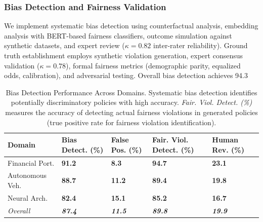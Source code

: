 \documentclass[manuscript,screen,review,anonymous,9pt]{acmart}
\newcommand{\tablesize}{\tiny}
\newcommand{\tablenumfmt}[1]{\textbf{#1}}
\newcommand{\tableheader}[1]{\textbf{#1}}
\begin{document}
\subsubsection{Bias Detection and Fairness Validation}
\label{subsubsec:bias_detection_evaluation}
We implement systematic bias detection using counterfactual analysis, embedding analysis with BERT-based fairness classifiers, outcome simulation against synthetic datasets, and expert review ($\kappa = 0.82$ inter-rater reliability). Ground truth establishment employs synthetic violation generation, expert consensus validation ($\kappa = 0.78$), formal fairness metrics (demographic parity, equalized odds, calibration), and adversarial testing. Overall bias detection achieves 94.3%

\begin{table}[htbp]
  \centering
  \caption{Bias Detection Performance Across Domains. Systematic bias detection identifies potentially discriminatory policies with high accuracy. \textit{Fair. Viol. Detect. (\%)} measures the accuracy of detecting actual fairness violations in generated policies (true positive rate for fairness violation identification).}
  \label{tab:bias_detection_performance}
  \tablesize
  \begin{tabular}{@{}l>{\centering\arraybackslash}p{1.1cm}>{\centering\arraybackslash}p{1.1cm}>{\centering\arraybackslash}p{1.2cm}>{\centering\arraybackslash}p{1.1cm}@{}}
    \toprule
    \tableheader{Domain} & \tableheader{Bias Detect. (\%)} & \tableheader{False Pos. (\%)} & \tableheader{Fair. Viol. Detect. (\%)} & \tableheader{Human Rev. (\%)} \\
    \midrule
    Financial Port.    & \tablenumfmt{91.2} & \tablenumfmt{8.3}  & \tablenumfmt{94.7} & \tablenumfmt{23.1} \\
    Autonomous Veh.     & \tablenumfmt{88.7} & \tablenumfmt{11.2} & \tablenumfmt{89.4} & \tablenumfmt{19.8} \\
    Neural Arch.    & \tablenumfmt{82.4} & \tablenumfmt{15.1} & \tablenumfmt{85.2} & \tablenumfmt{16.7} \\
    \midrule
    \textit{Overall} & \textit{\tablenumfmt{87.4}} & \textit{\tablenumfmt{11.5}} & \textit{\tablenumfmt{89.8}} & \textit{\tablenumfmt{19.9}} \\
    \bottomrule
  \end{tabular}
\end{table}
\end{document}
